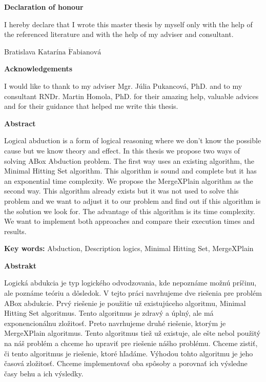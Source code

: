 \documentclass[12pt,a4paper]{article}
\newcommand{\textoverline}[1]{{\setul{-5em}{}$\overline{\mbox{#1}}$}}
\begin{document}
\pagebreak



\justify

\pagebreak
\thispagestyle{empty}
\vspace*{15cm}
{\large\bf Declaration of honour \par}
\vspace{0.8cm}
{\large{I hereby declare that I wrote this master thesis by myself only with the help of the referenced literature and with the help of my adviser and consultant.}} \par
\vspace{3cm}
{\large{Bratislava \hfill \textoverline{Katarína Fabianová}}}

\pagebreak
\thispagestyle{empty}
\par\vspace*{15cm}
{\large\bf \noindent Acknowledgements \par}
\vspace{0.8cm}
{\large{I would like to thank to my adviser Mgr. Júlia Pukancová, PhD. and to my consultant RNDr. Martin Homola, PhD. for their amazing help, valuable advices and for their guidance that helped me write this thesis.}}

\pagebreak
\thispagestyle{empty}
{\large\bf  \noindent Abstract \newline} 

Logical abduction is a form of logical reasoning where we don't know the possible cause but we know theory and effect. In this thesis we propose two ways of solving ABox Abduction problem. The first way uses an existing algorithm, the Minimal Hitting Set algorithm. This algorithm is sound and complete but it has an exponential time complexity. We propose the MergeXPlain algorithm as the second way. This algorithm already exists but it was not used to solve this problem and we want to adjust it to our problem and find out if this algorithm is the solution we look for. The advantage of this algorithm is its time complexity. We want to implement both approaches and compare their execution times and results. \newline

\noindent \textbf{Key words:}
Abduction, Description logics, Minimal Hitting Set, MergeXPlain

\pagebreak
\thispagestyle{empty}
{\large\bf  \noindent Abstrakt \newline} 

Logická abdukcia je typ logického odvodzovania, kde nepoznáme možnú príčinu, ale poznáme teóriu a dôsledok. V tejto práci navrhujeme dve riešenia pre problém ABox abdukcie. Prvý riešenie je použitie už existujúceho algoritmu, Minimal Hitting Set algoritmus. Tento algoritmus je zdravý a úplný, ale má exponencionálnu zložitosť. Preto navrhujeme druhé riešenie, ktorým je MergeXPlain algoritmus. Tento algoritmus tiež už existuje, ale ešte nebol použitý na náš problém a chceme ho upraviť pre riešenie nášho problému. Chceme zistiť, či tento algoritmus je riešenie, ktoré hľadáme. Výhodou tohto algoritmu je jeho časová zložitosť. Chceme implementovať oba spôsoby a porovnať ich výsledne časy behu a ich výsledky. \newline
\end{document}
